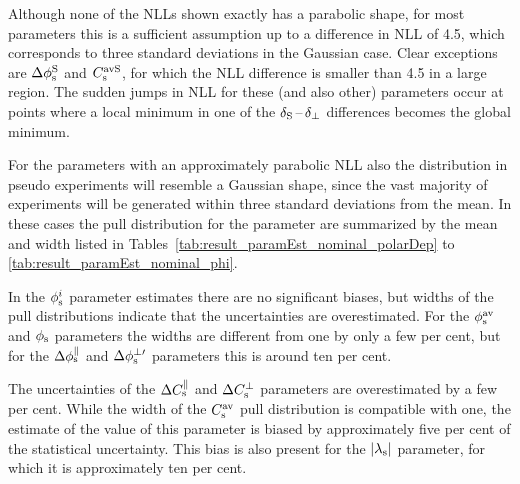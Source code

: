 Although none of the NLLs shown exactly has a parabolic shape, for most parameters this is a sufficient assumption up to a difference in
NLL of 4.5, which corresponds to three standard deviations in the Gaussian case. Clear exceptions are $\Delta\phi_\text{s}^{\text{S}}$ and $C_\text{s}^\text{avS}$, for which
the NLL difference is smaller than 4.5 in a large region. The sudden jumps in NLL for these (and also other) parameters occur at points
where a local minimum in one of the $\delta_\text{S}\,\text{--}\,\delta_{\perp\text{}}$ differences becomes the global minimum.

For the parameters with an approximately parabolic NLL also the distribution in pseudo experiments will resemble a Gaussian shape, since
the vast majority of experiments will be generated within three standard deviations from the mean. In these cases the pull distribution for
the parameter are summarized by the mean and width listed in Tables~\ref{tab:result_paramEst_nominal_polarDep} to
\ref{tab:result_paramEst_nominal_phi}.

In the $\phi_\text{s}^{i}$ parameter estimates there are no significant biases, but widths of the pull distributions indicate that the uncertainties
are overestimated. For the $\phi_\text{s}^{\text{av}}$ and $\phi_\text{s}$ parameters the widths are different from one by only a few per cent, but for the
$\Delta\phi_\text{s}^{\parallel}$ and $\Delta\phi_\text{s}^{\perp\prime}$ parameters this is around ten per cent.

The uncertainties of the $\Delta C_\text{s}^\parallel$ and $\Delta C_\text{s}^\perp$ parameters are overestimated by a few per cent. While the width of the $C_\text{s}^\text{av}$ pull
distribution is compatible with one, the estimate of the value of this parameter is biased by approximately five per cent of the
statistical uncertainty. This bias is also present for the $|{\lambda_{\text{s}}}|$ parameter, for which it is approximately ten per cent.

